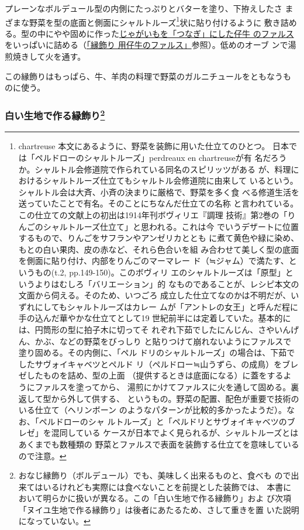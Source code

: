 \begin{recette}
プレーンなボルデュール型の内側にたっぷりとバターを塗り、下拵えしたさ
まざまな野菜を型の底面と側面にシャルトルーズ\footnote{chartreuse
  本文にあるように、野菜を装飾に用いた仕立てのひとつ。
  日本では「ペルドローのシャルトルーズ」perdreaux en chartreuseが有
  名だろうか。シャルトル会修道院で作られている同名のスピリッツがある
  が、料理におけるシャルトルーズ仕立てもシャルトル会修道院に由来して
  いるという。シャルトル会は大斉、小斉の決まりに厳格で、野菜を多く食
  べる修道生活を送っていたことで有名。そのことにちなんだ仕立ての名称
  と言われている。この仕立ての文献上の初出は1914年刊ボヴィリエ『調理
  技術』第2巻の「りんごのシャルトルーズ仕立て」と思われる。これは今
  でいうデザートに位置するもので、りんごをサフランやアンゼリカととも
  に煮て黄色や緑に染め、もとの白い果肉、皮の赤など、それら色合いを組
  み合わせて美しく型の底面を側面に貼り付け、内部をりんごのマーマレー
  ド（≒ジャム）で満たす、というもの(t.2, pp.149-150)。このボヴィリ
  エのシャルトルーズは「原型」というよりはむしろ「バリエーション」的
  なものであることが、レシピ本文の文面から伺える。そのため、いつごろ
  成立した仕立てなのかは不明だが、いずれにしてもシャルトルーズはカレー
  ムが「アントレの女王」と呼んだ程に手の込んだ華やかな仕立てとして19
  世紀前半には定着していた。基本的には、円筒形の型に拍子木に切ってそ
  れぞれ下茹でしたにんじん、さやいんげん、かぶ、などの野菜をびっしり
  と貼りつけて崩れないようにファルスで塗り固める。その内側に、「ペル
  ドリのシャルトルーズ」の場合は、下茹でしたサヴォイキャベツとペルド
  リ（ペルドロー≒山うずら、の成鳥）をブレゼしたものを詰め、型の上面
  （提供するときは底面になる）に蓋をするようにファルスを塗ってから、
  湯煎にかけてファルスに火を通して固める。裏返して型から外して供する、
  というもの。野菜の配置、配色が重要で技術のいる仕立て（ヘリンボーン
  のようなパターンが比較的多かったようだ）。なお、「ペルドローのシャ
  ルトルーズ」と「ペルドリとサヴォイキャベツのブレゼ」を混同している
  ケースが日本でよく見られるが、シャルトルーズとはあくまでも数種類の
  野菜とファルスで表面を装飾する仕立てを意味しているので注意。}状に貼り付けるように
敷き詰める。型の中にやや固めに作った\protect\hyperlink{farce-de-veau-pour-bordures}{じゃがいもを「つなぎ」にした仔牛
のファルス}をいっぱいに詰める（\protect\hyperlink{farce-de-veau-pour-bordures}{「縁飾り
用仔牛のファルス」}参照）。低めのオーブ ンで湯煎焼きして火を通す。

この縁飾りはもっぱら、牛、羊肉の料理で野菜のガルニチュールをともなうも
のに使う。

\maeaki

\hypertarget{bordures-en-pate-blanche}{%
\subsubsection[白い生地で作る縁飾り]{\texorpdfstring{白い生地で作る縁飾り\footnote{おなじ縁飾り（ボルデュール）でも、美味しく出来るものと、食べも
  ので出来てはいるけれども実際には食べないことを前提とした装飾では、
  本書において明らかに扱いが異なる。この「白い生地で作る縁飾り」およ
  び次項「ヌイユ生地で作る縁飾り」は後者にあたるため、さして重きを置
  いた説明になっていない。}}{白い生地で作る縁飾り}}\label{bordures-en-pate-blanche}}


\end{recette}
